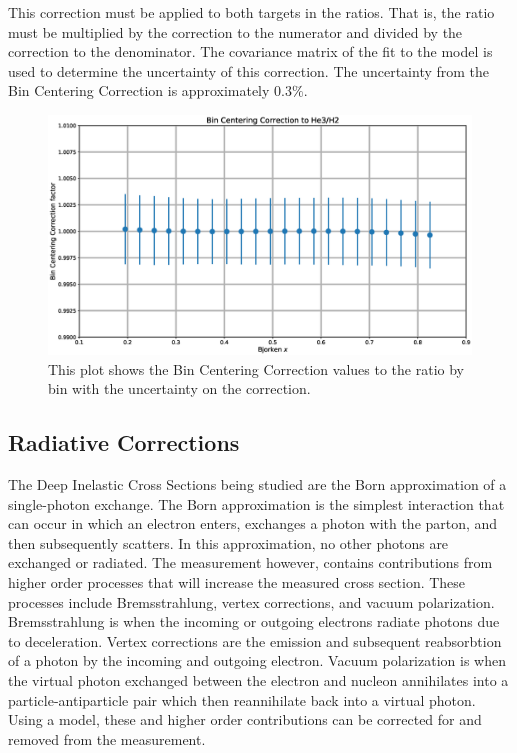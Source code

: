 This correction must be applied to both targets in the ratios. That is, the ratio must be multiplied by the correction to the numerator and divided by the correction to the denominator.\cite{wtsydp} The covariance matrix of the fit to the model is used to determine the uncertainty of this correction. The uncertainty from the Bin Centering Correction is approximately $0.3\%$.

\begin{figure}
	\includegraphics[width=\textwidth]{./analysis/fig/bcc.eps}
	\caption{This plot shows the Bin Centering Correction values to the  ratio by bin with the uncertainty on the correction.}
\end{figure}

\subsection{Radiative Corrections}

The Deep Inelastic Cross Sections being studied are the Born approximation of a single-photon exchange. The Born approximation is the simplest interaction that can occur in which an electron enters, exchanges a photon with the parton, and then subsequently scatters. In this approximation, no other photons are exchanged or radiated. The measurement however, contains contributions from higher order processes that will increase the measured cross section. These processes include Bremsstrahlung, vertex corrections, and vacuum polarization. Bremsstrahlung is when the incoming or outgoing electrons radiate photons due to deceleration. Vertex corrections are the emission and subsequent reabsorbtion of a photon by the incoming and outgoing electron. Vacuum polarization is when the virtual photon exchanged between the electron and nucleon annihilates into a particle-antiparticle pair which then reannihilate back into a virtual photon. Using a model, these and higher order contributions can be corrected for and removed from the measurement.

